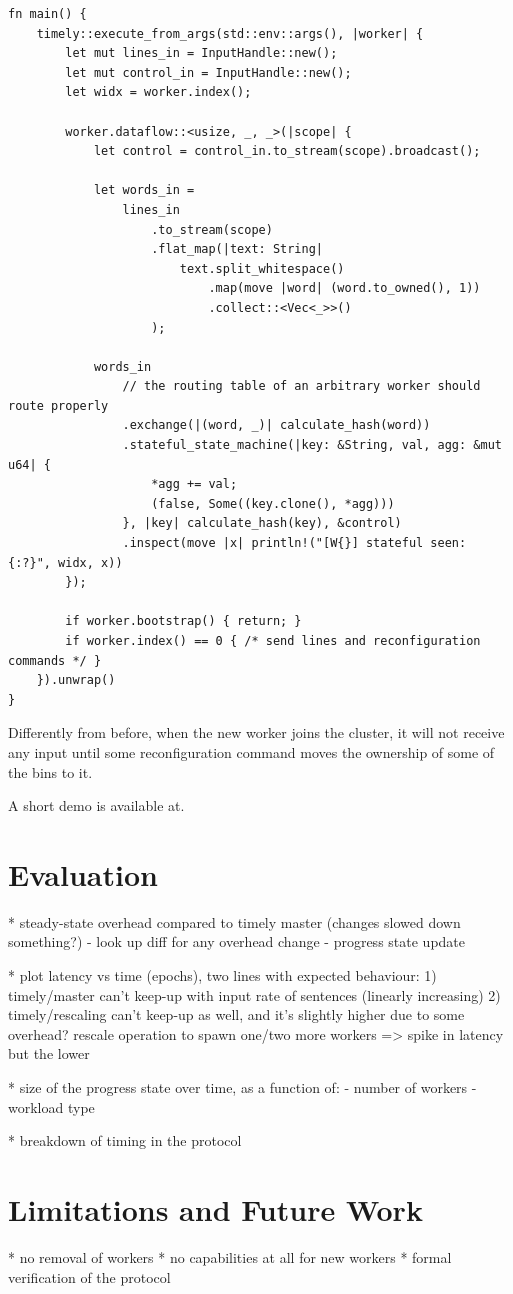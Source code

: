 \documentclass[12pt]{extarticle}
\begin{document}
\begin{verbatim}
fn main() {
    timely::execute_from_args(std::env::args(), |worker| {
        let mut lines_in = InputHandle::new();
        let mut control_in = InputHandle::new();
        let widx = worker.index();

        worker.dataflow::<usize, _, _>(|scope| {
            let control = control_in.to_stream(scope).broadcast();

            let words_in =
                lines_in
                    .to_stream(scope)
                    .flat_map(|text: String|
                        text.split_whitespace()
                            .map(move |word| (word.to_owned(), 1))
                            .collect::<Vec<_>>()
                    );

            words_in
                // the routing table of an arbitrary worker should route properly
                .exchange(|(word, _)| calculate_hash(word))
                .stateful_state_machine(|key: &String, val, agg: &mut u64| {
                    *agg += val;
                    (false, Some((key.clone(), *agg)))
                }, |key| calculate_hash(key), &control)
                .inspect(move |x| println!("[W{}] stateful seen: {:?}", widx, x))
        });

        if worker.bootstrap() { return; }
        if worker.index() == 0 { /* send lines and reconfiguration commands */ }
    }).unwrap()
}
\end{verbatim}


Differently from before, when the new worker joins the cluster, it will not receive any input until
some reconfiguration command moves the ownership of some of the bins to it.

A short demo is available at. %



\section{Evaluation}

* steady-state overhead compared to timely master (changes slowed down something?)
   - look up diff for any overhead change
   - progress state update

* plot latency vs time (epochs), two lines with expected behaviour:
    1) timely/master can't keep-up with input rate of sentences (linearly increasing)
    2) timely/rescaling can't keep-up as well, and it's slightly higher due to some overhead?
       rescale operation to spawn one/two more workers => spike in latency but the lower

* size of the progress state over time, as a function of:
  - number of workers
  - workload type

* breakdown of timing in the protocol

\section{Limitations and Future Work}

* no removal of workers
* no capabilities at all for new workers
* formal verification of the protocol
\end{document}
